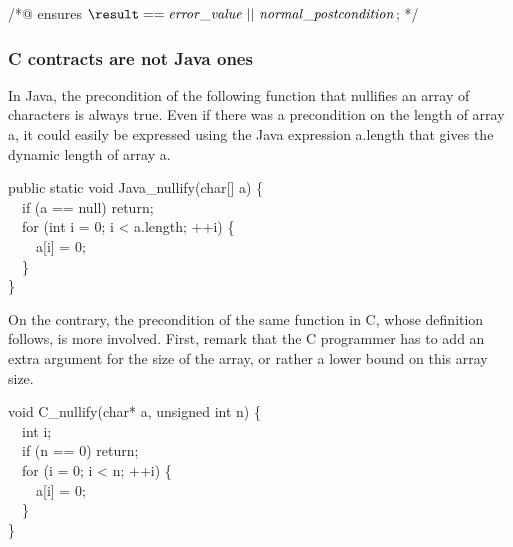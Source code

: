 \begin{flushleft}\ttfamily
/*@ ensures $\mathit{\texttt{{\textbackslash}result} == error\_value ~||~ normal\_postcondition}$; */
\end{flushleft}




%


\subsubsection*{C contracts are not Java ones}

In Java, the precondition of the following function that nullifies an
array of characters is always true. Even if there was a precondition
on the length of array {\ttfamily a}, it could easily be expressed using
the Java expression {\ttfamily a.length} that gives the dynamic length
of array {\ttfamily a}.

\begin{flushleft}\ttfamily
public static void Java\_nullify(char[] a) \{ \\
~~if (a == null) return; \\
~~for (int i = 0; i < a.length; ++i) \{ \\
~~~~a[i] = 0; \\
~~\} \\
\}
\end{flushleft}

On the contrary, the precondition of the same function in C, whose
definition follows, is more involved. First, remark that the
C programmer has to add an extra argument for the size of the array,
or rather a lower bound on this array size.

\begin{flushleft}\ttfamily
void C\_nullify(char* a, unsigned int n) \{ \\
~~int i; \\
~~if (n == 0) return; \\
~~for (i = 0; i < n; ++i) \{ \\
~~~~a[i] = 0; \\
~~\} \\
\}
\end{flushleft}

